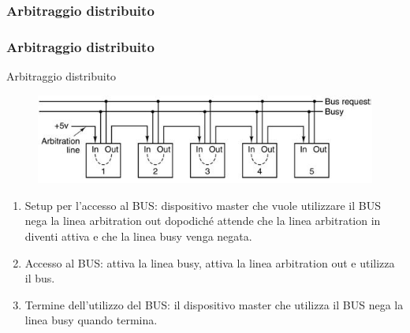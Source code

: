 \subsubsection[Arbitraggio distribuito]{Arbitraggio distribuito}
\begin{frame}
	\frametitle{Arbitraggio distribuito}
	  
	\begin{block}{Arbitraggio distribuito}
		\begin{figure}[!htbp]
			\centering
			\includegraphics[width=0.8\linewidth]{images/6_bus/daisy_chaining_distributed.jpg}
		\end{figure}
		
		\begin{footnotesize}
		\begin{enumerate}
			\item Setup per l'accesso al BUS: dispositivo master che vuole utilizzare il BUS nega la linea arbitration out dopodiché attende che la linea arbitration in diventi attiva e che la linea busy venga negata.
			\item Accesso al BUS: attiva la linea busy, attiva la linea arbitration out e utilizza il bus.
			\item Termine dell'utilizzo del BUS: il dispositivo master che utilizza il BUS nega la linea busy quando termina.
		\end{enumerate}
		\end{footnotesize}
		
	\end{block}
\end{frame}



